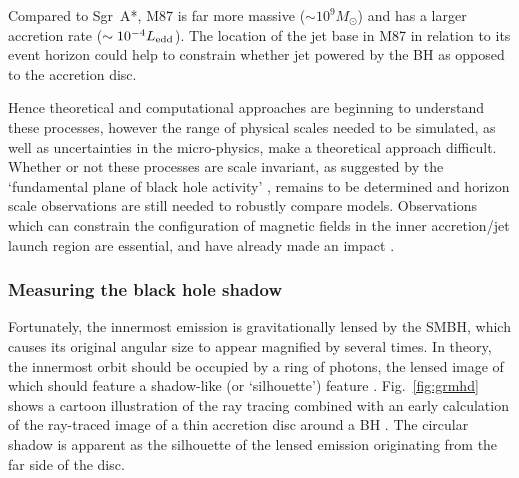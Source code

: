Compared to Sgr~A*, M87 is far more massive ($\sim 10^9 M_\odot$) and has a larger accretion rate ($\sim 10^{-4} L_{\rm edd}$). The location of the jet base in M87 in relation to its event horizon could help to constrain whether jet powered by the BH as opposed to the accretion disc.

Hence theoretical and computational approaches are beginning to understand these processes, however the range of physical scales needed to be simulated, as well as uncertainties in the micro-physics, make a theoretical approach difficult. Whether or not these processes are scale invariant, as suggested by the `fundamental plane of black hole activity' \citep{Merloni_2003}, remains to be determined and horizon scale observations are still needed to robustly compare models. Observations which can constrain the configuration of magnetic fields in the inner accretion/jet launch region are essential, and have already made an impact \citep{Johnson_2015b}.

\subsubsection{Measuring the black hole shadow}

Fortunately, the innermost emission is gravitationally lensed by the SMBH, which causes its original angular size to appear magnified by several times. In theory, the innermost orbit should be occupied by a ring of photons, the lensed image of which should feature a shadow-like (or `silhouette') feature \citep{Bardeen_1973,Luminet_1979, Falcke_2000,Takahashi_2004, Johannsen_2010}. Fig.~\ref{fig:grmhd} shows a cartoon illustration of the ray tracing combined with an early calculation of the ray-traced image of a thin accretion disc around a BH \citep{Luminet_1979}. The circular shadow is apparent as the silhouette of the lensed emission originating from the far side of the disc. 



